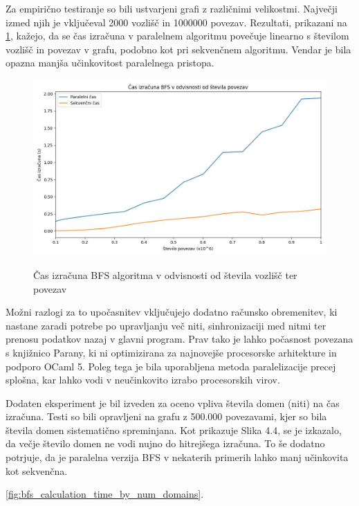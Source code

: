 \documentclass[mat1, tisk]{fmfdelo}
\begin{document}
Za empirično testiranje so bili ustvarjeni grafi z različnimi velikostmi. Največji izmed njih je vključeval 2000
vozlišč in 1000000 povezav. Rezultati, prikazani na \ref{fig:bfs_calculation_time_by_graph_size}, kažejo, da se čas
izračuna v paralelnem algoritmu povečuje linearno s številom vozlišč in povezav v grafu, podobno kot pri sekvenčnem
algoritmu. Vendar je bila opazna manjša učinkovitost paralelnega pristopa.

\begin{figure}[h!]
  \centering
  \caption{Čas izračuna BFS algoritma v odvisnosti od števila vozlišč ter povezav}
  \includegraphics[width=15cm]{slike/bfs_v_odvisnosti_od_velikosti_grafa.jpg}
  \label{fig:bfs_calculation_time_by_graph_size}
\end{figure}

Možni razlogi za to upočasnitev vključujejo dodatno računsko obremenitev, ki nastane zaradi potrebe po upravljanju več
niti, sinhronizaciji med nitmi ter prenosu podatkov nazaj v glavni program. Prav tako je lahko počasnost povezana s
knjižnico Parany, ki ni optimizirana za najnovejše procesorske arhitekture in podporo OCaml 5. Poleg tega je bila
uporabljena metoda paralelizacije precej splošna, kar lahko vodi v neučinkovito izrabo procesorskih virov.

Dodaten eksperiment je bil izveden za oceno vpliva števila domen (niti) na čas izračuna. Testi so bili opravljeni na
grafu z 500.000 povezavami, kjer so bila števila domen sistematično spreminjana. Kot prikazuje Slika 4.4, se je
izkazalo, da večje število domen ne vodi nujno do hitrejšega izračuna. To še dodatno potrjuje, da je paralelna
verzija BFS v nekaterih primerih lahko manj učinkovita kot sekvenčna.

\ref{fig:bfs_calculation_time_by_num_domains}.
\end{document}
